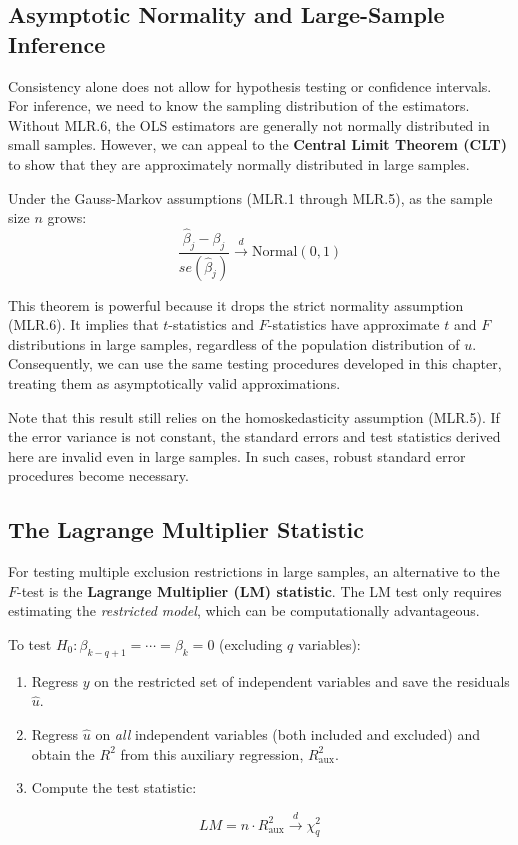 \subsection{Asymptotic Normality and Large-Sample Inference}

Consistency alone does not allow for hypothesis testing or confidence intervals. For inference, we need to know the sampling distribution of the estimators. Without MLR.6, the OLS estimators are generally not normally distributed in small samples. However, we can appeal to the \textbf{Central Limit Theorem (CLT)} to show that they are approximately normally distributed in large samples.

\begin{theorem}
Under the Gauss-Markov assumptions (MLR.1 through MLR.5), as the sample size $n$ grows:
$$\frac{\hat{\beta}_j - \beta_j}{se(\hat{\beta}_j)} \xrightarrow{d} \text{Normal}(0, 1)$$
\end{theorem}

This theorem is powerful because it drops the strict normality assumption (MLR.6). It implies that $t$-statistics and $F$-statistics have approximate $t$ and $F$ distributions in large samples, regardless of the population distribution of $u$. Consequently, we can use the same testing procedures developed in this chapter, treating them as asymptotically valid approximations.

Note that this result still relies on the homoskedasticity assumption (MLR.5). If the error variance is not constant, the standard errors and test statistics derived here are invalid even in large samples. In such cases, robust standard error procedures become necessary.
\subsection{The Lagrange Multiplier Statistic}

For testing multiple exclusion restrictions in large samples, an alternative to the $F$-test is the \textbf{Lagrange Multiplier (LM) statistic}. The LM test only requires estimating the \textit{restricted model}, which can be computationally advantageous.

To test $H_0: \beta_{k-q+1} = \cdots = \beta_k = 0$ (excluding $q$ variables):
\begin{enumerate}
    \item Regress $y$ on the restricted set of independent variables and save the residuals $\hat{u}$.
    \item Regress $\hat{u}$ on \emph{all} independent variables (both included and excluded) and obtain the $R^2$ from this auxiliary regression, $R_{\text{aux}}^2$.
    \item Compute the test statistic:
\end{enumerate}
$$LM = n \cdot R_{\text{aux}}^2 \xrightarrow{d} \chi^2_q$$

